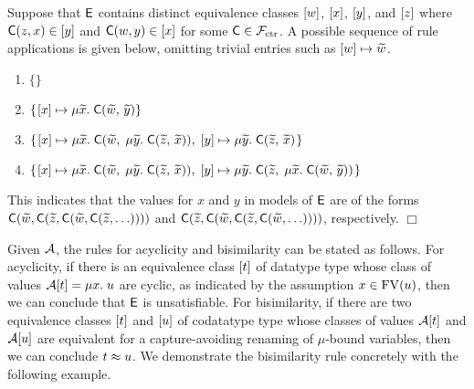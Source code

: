 \begin{example}
Suppose that $\mathsf{E}$ contains distinct equivalence classes $[w]$, $[x]$, $[y]$, and $[z]$
where $\textsf{C}(z,x) \in [y]$ and $\textsf{C}(w,y) \in [x]$ for some $\textsf{C} \in \mathcal{F}_{\mathrm{ctr}}$.
A possible sequence of  rule applications is given below, omitting
trivial entries such as $[w] \mapsto {\widetilde{w}}$.
%
\begin{enumerate}
\item \noindent{}$\{  \}$
\item \noindent{}$\{\vthinspace  \ec{x} \mapsto \mu {\Varec{x}}.\; \const{C}( {\Varec{w}},\, {\Varec{y}} ) \}$
\item \noindent{}$\{\vthinspace  \ec{x} \mapsto \mu {\Varec{x}}.\; \const{C}( {\Varec{w}},\; \mu {\Varec{y}}.\; \const{C}( {\Varec{z}},\, {\Varec{x}} ) ),\;
  \ec{y} \mapsto \mu {\Varec{y}}.\; \const{C}( {\Varec{z}},\, {\Varec{x}} ) \vthinspace\}$
\item \noindent{}$\{\vthinspace  \ec{x} \mapsto \mu {\Varec{x}}.\; \const{C}( {\Varec{w}},\; \mu {\Varec{y}}.\; \const{C}( {\Varec{z}},\, {\Varec{x}} ) ),\;
  \ec{y} \mapsto \mu {\Varec{y}}.\; \const{C}( {\Varec{z}},\; \mu {\Varec{x}}.\; \const{C}( {\Varec{w}},\, {\Varec{y}} ) ) \vthinspace\}$
\end{enumerate}
%
This indicates that the values for $x$ and $y$ in models of $\mathsf{E}$
are of the forms $\textsf{C}( {\widetilde{w}}, \textsf{C}( {\widetilde{z}}, \textsf{C}( {\widetilde{w}},\allowbreak \textsf{C}( {\widetilde{z}},\ldots ))))$
and $\textsf{C}( {\widetilde{z}}, \textsf{C}( {\widetilde{w}}, \textsf{C}( {\widetilde{z}}, \textsf{C}( {\widetilde{w}}, \ldots ))))$,
respectively. %
$\Box$
\end{example}

Given $\mathcal{A}$, the rules for acyclicity and bisimilarity can be stated as follows.
For acyclicity, if there is an equivalence class $[t]$ of datatype type whose class of values $\mathcal{A} [t] = \mu x.\; u$ are cyclic,
as indicated by the assumption $x \in \mathrm{FV}( u )$,
then we can conclude that $\mathsf{E}$ is unsatisfiable.
For bisimilarity, if there are two equivalence classes $[t]$ and $[u]$ 
of codatatype type whose classes of values $\mathcal{A} [t]$ and $\mathcal{A} [u]$ are equivalent for a capture-avoiding renaming of $\mu$-bound variables,
then we can conclude $t \approx u$.
We demonstrate the bisimilarity rule concretely with the following example.

